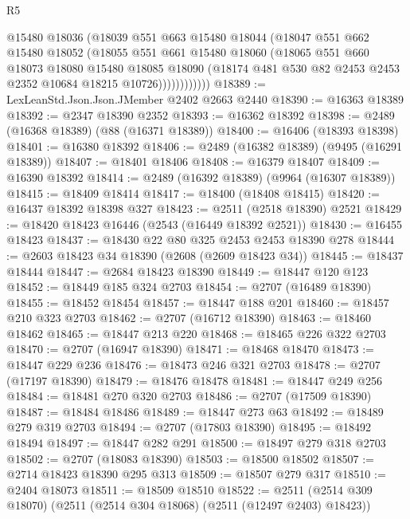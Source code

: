 \begin{lexlean}{R5}
\begin{coremodule}
                  @15480
                  @18036
                  (@18039
                    @551
                    @663
                    @15480
                    @18044
                    (@18047
                      @551
                      @662
                      @15480
                      @18052
                      (@18055
                        @551
                        @661
                        @15480
                        @18060
                        (@18065
                          @551
                          @660
                          @18073
                          @18080
                          @15480
                          @18085
                          @18090
                          (@18174 @481 @530 @82 @2453 @2453 @2352 @10684 @18215 @10726))))))))))))
@18389 := LexLeanStd.Json.Json.JMember @2402 @2663 @2440
@18390 := @16363 @18389
@18392 := @2347 @18390 @2352
@18393 := @16362 @18392
@18398 := @2489 (@16368 @18389) (@88 (@16371 @18389))
@18400 := @16406 (@18393 @18398)
@18401 := @16380 @18392
@18406 := @2489 (@16382 @18389) (@9495 (@16291 @18389))
@18407 := @18401 @18406
@18408 := @16379 @18407
@18409 := @16390 @18392
@18414 := @2489 (@16392 @18389) (@9964 (@16307 @18389))
@18415 := @18409 @18414
@18417 := @18400 (@18408 @18415)
@18420 := @16437 @18392 @18398 @327
@18423 := @2511 (@2518 @18390) @2521
@18429 := @18420 @18423 @16446 (@2543 (@16449 @18392 @2521))
@18430 := @16455 @18423
@18437 := @18430 @22 @80 @325 @2453 @2453 @18390 @278
@18444 := @2603 @18423 @34 @18390 (@2608 (@2609 @18423 @34))
@18445 := @18437 @18444
@18447 := @2684 @18423 @18390
@18449 := @18447 @120 @123
@18452 := @18449 @185 @324 @2703
@18454 := @2707 (@16489 @18390)
@18455 := @18452 @18454
@18457 := @18447 @188 @201
@18460 := @18457 @210 @323 @2703
@18462 := @2707 (@16712 @18390)
@18463 := @18460 @18462
@18465 := @18447 @213 @220
@18468 := @18465 @226 @322 @2703
@18470 := @2707 (@16947 @18390)
@18471 := @18468 @18470
@18473 := @18447 @229 @236
@18476 := @18473 @246 @321 @2703
@18478 := @2707 (@17197 @18390)
@18479 := @18476 @18478
@18481 := @18447 @249 @256
@18484 := @18481 @270 @320 @2703
@18486 := @2707 (@17509 @18390)
@18487 := @18484 @18486
@18489 := @18447 @273 @63
@18492 := @18489 @279 @319 @2703
@18494 := @2707 (@17803 @18390)
@18495 := @18492 @18494
@18497 := @18447 @282 @291
@18500 := @18497 @279 @318 @2703
@18502 := @2707 (@18083 @18390)
@18503 := @18500 @18502
@18507 := @2714 @18423 @18390 @295 @313
@18509 := @18507 @279 @317
@18510 := @2404 @18073
@18511 := @18509 @18510
@18522 := @2511 (@2514 @309 @18070) (@2511 (@2514 @304 @18068) (@2511 (@12497 @2403) @18423))

\end{coremodule}
\end{lexlean}

